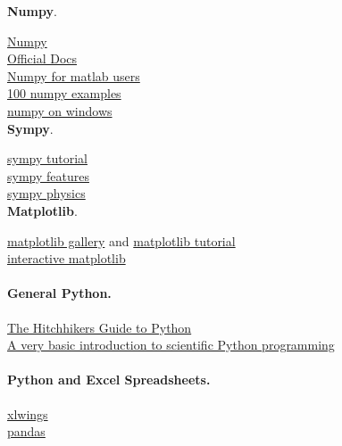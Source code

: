 \documentclass[%
oneside,                 %
final,                   %
10pt]{article}
\begin{document}
\textbf{Numpy}.

\href{{https://wiki.python.org/moin/NumericAndScientific}}{Numpy}  \\
\href{{https://docs.scipy.org/doc/numpy-dev/contents.html}}{Official Docs}  \\
\href{{https://docs.scipy.org/doc/numpy-dev/user/numpy-for-matlab-users.html}}{Numpy for matlab users}  \\
\href{{https://github.com/rougier/numpy-100}}{100 numpy examples}  \\
\href{{https://github.com/numpy/numpy/wiki/Numerical-software-on-Windows}}{numpy on windows}  \\

\textbf{Sympy}.

\href{{http://docs.sympy.org/dev/tutorial/intro.html}}{sympy tutorial} \\
\href{{http://www.sympy.org/en/features.html}}{sympy features} \\
\href{{http://docs.sympy.org/dev/modules/physics/mechanics/}}{sympy physics} \\

\textbf{Matplotlib}.

\href{{http://matplotlib.org/gallery.html}}{matplotlib gallery} and \href{{https://github.com/rougier/matplotlib-tutorial}}{matplotlib tutorial}  \\
\href{{http://central.scipy.org/item/84/1/simple-interactive-matplotlib-plots}}{interactive matplotlib} \\

\paragraph{General Python.}
\href{{http://docs.python-guide.org/en/latest/}}{The Hitchhikers Guide to Python} \\
\href{{http://hplgit.github.io/bumpy/doc/pub/._basics000.html#table_of_contents}}{A very basic introduction to scientific Python programming}  \\

\paragraph{Python and Excel Spreadsheets.}
\href{{http://www.xlwings.org}}{xlwings} \\
\href{{http://pandas.pydata.org}}{pandas} \\
\end{document}
